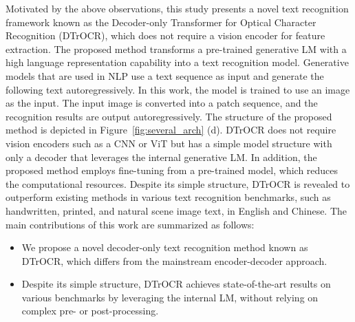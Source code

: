\documentclass[10pt,twocolumn,letterpaper]{article}
\begin{document}
Motivated by the above observations, this study presents a novel text recognition framework known as the Decoder-only Transformer for Optical Character Recognition (DTrOCR), which does not require a vision encoder for feature extraction.
The proposed method transforms a pre-trained generative LM with a high language representation capability into a text recognition model.
Generative models that are used in NLP use a text sequence as input and generate the following text autoregressively.
In this work, the model is trained to use an image as the input. 
The input image is converted into a patch sequence, and the recognition results are output autoregressively.
The structure of the proposed method is depicted in Figure~\ref{fig:several_arch} (d).
DTrOCR does not require vision encoders such as a CNN or ViT but has a simple model structure with only a decoder that leverages the internal generative LM.
In addition, the proposed method employs fine-tuning from a pre-trained model, which reduces the computational resources.
Despite its simple structure, DTrOCR is revealed to outperform existing methods in various text recognition benchmarks, such as handwritten, printed, and natural scene image text, in English and Chinese.
The main contributions of this work are summarized as follows:
\begin{itemize}
    \item We propose a novel decoder-only text recognition method known as DTrOCR, which differs from the mainstream encoder-decoder approach.
    \item Despite its simple structure, DTrOCR achieves state-of-the-art results on various benchmarks by leveraging the internal LM, without relying on complex pre- or post-processing.

    
\end{itemize}


 
\end{document}

